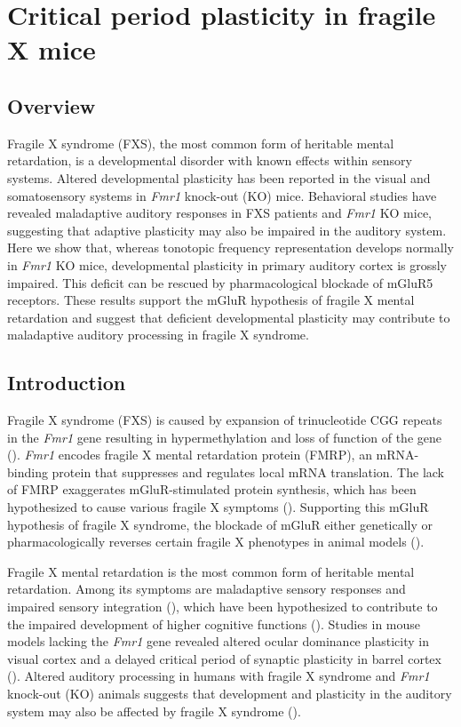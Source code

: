 \chapter{Critical period plasticity in fragile X mice}

\section{Overview}
\newrefsection

Fragile X syndrome (FXS), the most common form of heritable mental retardation, is a developmental disorder with known effects within sensory systems. Altered developmental plasticity has been reported in the visual and somatosensory systems in \textit{Fmr1} knock-out (KO) mice. Behavioral studies have revealed maladaptive auditory responses in FXS patients and \textit{Fmr1} KO mice, suggesting that adaptive plasticity may also be impaired in the auditory system. Here we show that, whereas tonotopic frequency representation develops normally in \textit{Fmr1} KO mice, developmental plasticity in primary auditory cortex is grossly impaired. This deficit can be rescued by pharmacological blockade of mGluR5 receptors. These results support the mGluR hypothesis of fragile X mental retardation and suggest that deficient developmental plasticity may contribute to maladaptive auditory processing in fragile X syndrome.

\section{Introduction}

Fragile X syndrome (FXS) is caused by expansion of trinucleotide CGG repeats in the \textit{Fmr1} gene resulting in hypermethylation and loss of function of the gene (\cite{Jin2003}). \textit{Fmr1} encodes fragile X mental retardation protein (FMRP), an mRNA-binding protein that suppresses and regulates local mRNA translation. The lack of FMRP exaggerates mGluR-stimulated protein synthesis, which has been hypothesized to cause various fragile X symptoms (\cite{Bear2004, Osterweil2010}). Supporting this mGluR hypothesis of fragile X syndrome, the blockade of mGluR either genetically or pharmacologically reverses certain fragile X phenotypes in animal models (\cite{McBride2005, Yan2005, Dolen2007, DeVrij2008, Meredith2011, Su2011, Michalon2012, Thomas2012}).

Fragile X mental retardation is the most common form of heritable mental retardation. Among its symptoms are maladaptive sensory responses and impaired sensory integration (\cite{Miller1999, Chen2001, Nielsen2002}), which have been hypothesized to contribute to the impaired development of higher cognitive functions (\cite{Hanson, Leblanc2011}). Studies in mouse models lacking the \textit{Fmr1} gene revealed altered ocular dominance plasticity in visual cortex and a delayed critical period of synaptic plasticity in barrel cortex (\cite{Dolen2007, Harlow2010a}). Altered auditory processing in humans with fragile X syndrome and \textit{Fmr1} knock-out (KO) animals suggests that development and plasticity in the auditory system may also be affected by fragile X syndrome (\cite{Miller1999, Chen2001, Nielsen2002}).

